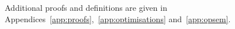 \documentclass[acmsmall,review,anonymous,screen]{acmart}
\begin{document}
\noindent Additional proofs and definitions are given in
Appendices~\ref{app:proofs},~\ref{app:optimisations} and~\ref{app:opsem}.

%
%






\end{document}
